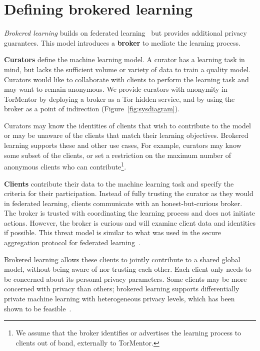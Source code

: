 \section{Defining brokered learning}

\emph{Brokered learning} builds on federated 
learning~\cite{McMahan:2017} but provides additional privacy
guarantees. This model introduces a \textbf{broker} to mediate the
learning process. 

\textbf{Curators} define the machine learning model. A curator has a
learning task in mind, but lacks the sufficient volume or variety of
data to train a quality model. Curators would like to collaborate with
clients to perform the learning task and may want to remain
anonymous. We provide curators with anonymity in TorMentor by
deploying a broker as a Tor hidden service, and by using the broker
as a point of indirection (Figure~\ref{fig:sysdiagram}).


Curators may know the identities of clients that wish to contribute to
the model or may be unaware of the clients that match their learning
objectives. Brokered learning supports these and other use cases, For
example, curators may know some subset of the clients, or set a
restriction on the maximum number of anonymous clients who can
contribute\footnote{We assume that the broker identifies or advertises
the learning process to clients out of band, externally to TorMentor.}.

\textbf{Clients} contribute their data to the machine learning task
and specify the criteria for their participation. Instead of fully
trusting the curator as they would in federated learning, clients
communicate with an honest-but-curious broker. The broker is trusted
with coordinating the learning process and does not initiate actions.
However, the broker is curious and will examine client data and
identities if possible. This threat model is similar to what was used
in the secure aggregation protocol for federated 
learning~\cite{Bonawitz:2017}.

Brokered learning allows these clients to jointly contribute to a
shared global model, without being aware of nor trusting each other.
Each client only needs to be concerned about its personal privacy
parameters. Some clients may be more concerned with privacy than
others; brokered learning supports differentially private
machine learning with heterogeneous privacy levels, which has been
shown to be feasible~\cite{Geyer:2017}. 

